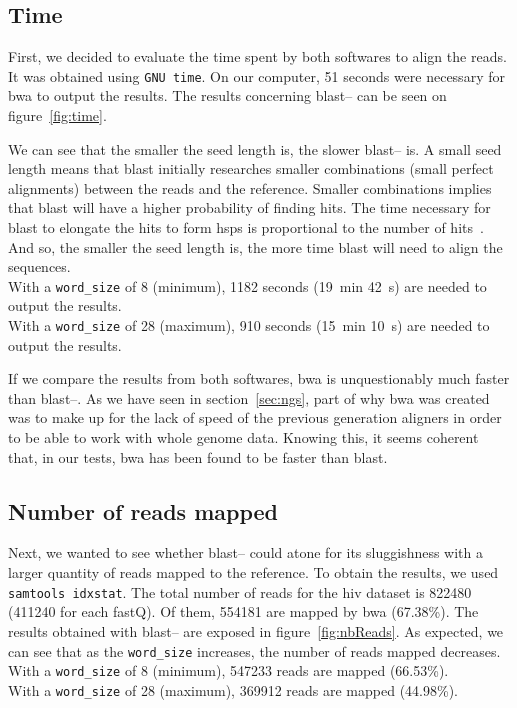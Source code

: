 \subsection{Time}
First, we decided to evaluate the time spent by both softwares to align the reads.
It was obtained using \texttt{GNU time}.
On our computer, 51 seconds were necessary for \gls{bwa} to output the results.
The results concerning \gls{blast}--\blastobam{} can be seen on figure~\ref{fig:time}.

We can see that the smaller the seed length is, the slower \gls{blast}--\blastobam{} is.
A small seed length means that \gls{blast} initially researches smaller combinations (small perfect alignments) between the reads and the reference.
Smaller combinations implies that \gls{blast} will have a higher probability of finding hits.
The time necessary for \gls{blast} to elongate the hits to form \glspl{hsp} is proportional to the number of hits~\cite{Altschul1990}.
And so, the smaller the seed length is, the more time \gls{blast} will need to align the sequences.\\
With a \texttt{word\_size} of 8 (minimum), 1182 seconds (19~min 42~s) are needed to output the results.\\
With a \texttt{word\_size} of 28 (maximum), 910 seconds (15~min 10~s) are needed to output the results.

If we compare the results from both softwares, \gls{bwa} is unquestionably much faster than \gls{blast}--\blastobam{}.
As we have seen in section~\ref{sec:ngs}, part of why \gls{bwa} was created was to make up for the lack of speed of the previous generation aligners in order to be able to work with whole genome data.
Knowing this, it seems coherent that, in our tests, \gls{bwa} has been found to be faster than \gls{blast}.


\subsection{Number of reads mapped}
Next, we wanted to see whether \gls{blast}--\blastobam{} could atone for its sluggishness with a larger quantity of reads mapped to the reference.
To obtain the results, we used \texttt{samtools idxstat}.
The total number of reads for the \gls{hiv} dataset is 822480 (411240 for each fastQ).
Of them, 554181 are mapped by \gls{bwa} (67.38\%).
The results obtained with \gls{blast}--\blastobam{} are exposed in figure~\ref{fig:nbReads}.
As expected, we can see that as the \texttt{word\_size} increases, the number of reads mapped decreases.\\
With a \texttt{word\_size} of 8 (minimum), 547233 reads are mapped (66.53\%).\\
With a \texttt{word\_size} of 28 (maximum), 369912 reads are mapped (44.98\%).

